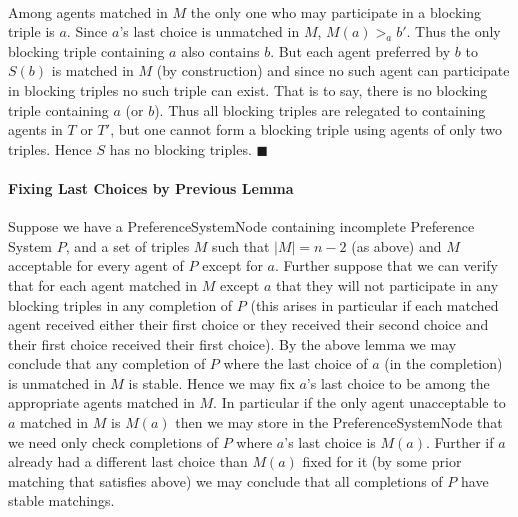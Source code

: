 \documentclass[letterpaper,12pt,oneside,onecolumn]{article}
\begin{document}
\paragraph{}
Among agents matched in $M$ the only one who may participate in a blocking triple is $a$. Since $a$'s last choice is unmatched in $M$, $M(a) >_a b'$. Thus the only blocking triple containing $a$ also contains $b$. But each agent preferred by $b$ to $S(b)$ is matched in $M$ (by construction) and since no such agent can participate in blocking triples no such triple can exist. That is to say, there is no blocking triple containing $a$ (or $b$). Thus all blocking triples are relegated to containing agents in $T$ or $T'$, but one cannot form a blocking triple using agents of only two triples. Hence $S$ has no blocking triples. $\blacksquare$
\paragraph{Fixing Last Choices by Previous Lemma}
Suppose we have a PreferenceSystemNode containing incomplete Preference System $P$, and a set of triples $M$ such that $|M| = n-2$ (as above) and $M$ acceptable for every agent of $P$ except for $a$. Further suppose that we can verify that for each agent matched in $M$ except $a$ that they will not participate in any blocking triples in any completion of $P$ (this arises in particular if each matched agent received either their first choice or they received their second choice and their first choice received their first choice). By the above lemma we may conclude that any completion of $P$ where the last choice of $a$ (in the completion) is unmatched in $M$ is stable. Hence we may fix $a$'s last choice to be among the appropriate agents matched in $M$. In particular if the only agent unacceptable to $a$ matched in $M$ is $M(a)$ then we may store in the PreferenceSystemNode that we need only check completions of $P$ where $a$'s last choice is $M(a)$. Further if $a$ already had a different last choice than $M(a)$ fixed for it (by some prior matching that satisfies above) we may conclude that all completions of $P$ have stable matchings.
\end{document}
